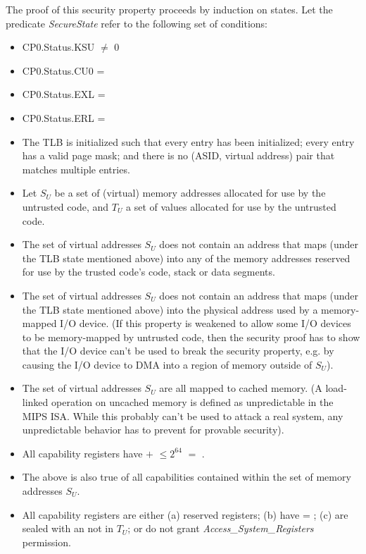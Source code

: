 The proof of this security property proceeds by induction on states. Let the
predicate \emph{SecureState} refer to the following set of conditions:

\begin{itemize}
\item
CP0.Status.KSU $\neq$ 0
\item
CP0.Status.CU0 = \algorithmicfalse{}
\item
CP0.Status.EXL = \algorithmicfalse{}
\item
CP0.Status.ERL = \algorithmicfalse{}
\item
The TLB is initialized such that every entry has been initialized; every entry has
a valid page mask; and there is no (ASID, virtual address) pair that matches multiple
entries.
\item
Let $S_U$ be a set of (virtual) memory addresses allocated for use by the untrusted code,
and $T_U$ a set of \cotype{} values allocated for use by the untrusted code.
\item
The set of virtual addresses $S_U$ does not contain an address that maps (under the
TLB state mentioned above) into any of the memory addresses reserved for use
by the trusted code's code, stack or data segments.
\item
The set of virtual addresses $S_U$ does not contain an address that maps (under the
TLB state mentioned above) into the physical address used by a memory-mapped I/O
device. (If this property is weakened to allow some I/O devices to be memory-mapped
by untrusted code, then the security proof has to show that the I/O device can't
be used to break the security property, e.g. by causing the I/O device to DMA
into a region of memory outside of $S_U$).
\item
The set of virtual addresses $S_U$ are all mapped to cached memory. (A load-linked
operation on uncached memory is defined as unpredictable in the MIPS ISA. While
this probably can't be used to attack a real system, any unpredictable behavior
has to prevent for provable security).
\item
All capability registers have \cbase{} $+$ \clength{} $\leq 2^{64}$ 
\algorithmicor{} \ctag{} $=$ \algorithmicfalse{}.
\item
The above is also true of all capabilities contained within the set of memory
addresses $S_U$.
\item
All capability registers are either (a) reserved registers; (b) have \ctag{} =
\algorithmicfalse{}; (c) are sealed with an \cotype{} not in $T_U$; or do not
grant \emph{Access\_System\_Registers} permission.

\end{itemize}
